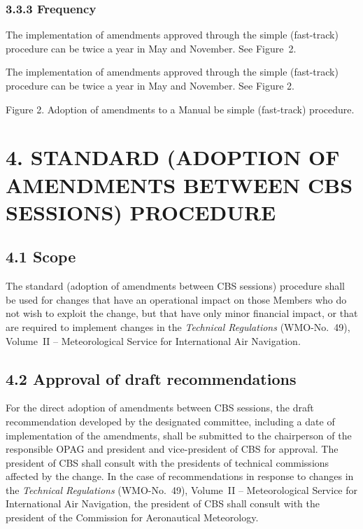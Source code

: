\hypertarget{frequency}{%
\subsubsection{3.3.3 Frequency }\label{frequency}}

The implementation of amendments approved through the simple (fast-track) procedure can be twice a year in May and November. See Figure~2.

The implementation of amendments approved through the simple (fast-track) procedure can be twice a year in May and November. See Figure 2.

Figure 2. Adoption of amendments to a Manual be simple (fast-track) procedure.

\hypertarget{standard-adoption-of-amendments-between-cbs-sessions-procedure}{%
\section{4. STANDARD (ADOPTION OF AMENDMENTS BETWEEN CBS SESSIONS) PROCEDURE}\label{standard-adoption-of-amendments-between-cbs-sessions-procedure}}

\hypertarget{scope-1}{%
\subsection{4.1 Scope}\label{scope-1}}

The standard (adoption of amendments between CBS sessions) procedure shall be used for changes that have an operational impact on those Members who do not wish to exploit the change, but that have only minor financial impact, or that are required to implement changes in the \emph{Technical Regulations} (WMO-No.~49), Volume~II -- Meteorological Service for International Air Navigation.

\hypertarget{approval-of-draft-recommendations}{%
\subsection{4.2 Approval of draft recommendations}\label{approval-of-draft-recommendations}}

For the direct adoption of amendments between CBS sessions, the draft recommendation developed by the designated committee, including a date of implementation of the amendments, shall be submitted to the chairperson of the responsible OPAG and president and vice-president of CBS for approval. The president of CBS shall consult with the presidents of technical commissions affected by the change. In the case of recommendations in response to changes in the \emph{Technical Regulations} (WMO-No.~49), Volume~II -- Meteorological Service for International Air Navigation, the president of CBS shall consult with the president of the Commission for Aeronautical Meteorology.

